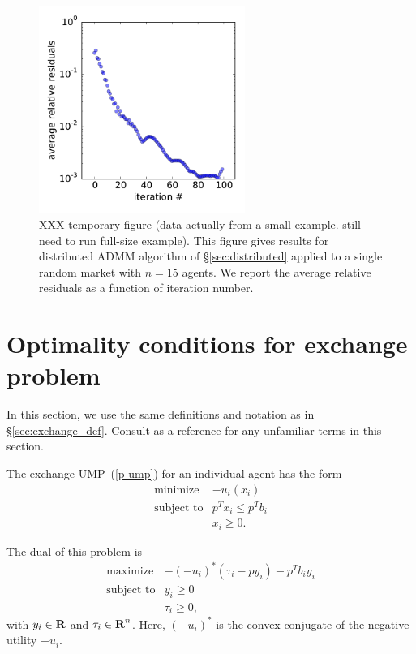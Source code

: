 \documentclass[12pt]{article}
\begin{document}
\begin{figure}
\begin{center}
\includegraphics[width=0.6\textwidth]{figures/admm}
\end{center}
\caption{XXX temporary figure (data actually from a small example. still need
to run full-size example). This figure gives results for distributed ADMM
algorithm of \S\ref{sec:distributed} applied to a single random market
with $n=15$ agents. We report the average relative residuals as a function
of iteration number.}
\label{f-admm}
\end{figure}


\appendix


\section{Optimality conditions for exchange problem}
\label{sec:exchange_proof}

In this section, we use the same definitions and notation as in
\S\ref{sec:exchange_def}.
Consult \cite{BoV:04} as a reference for any
unfamiliar terms in this section.

The exchange UMP~(\ref{p-ump}) for an individual agent has the form
\[
\begin{array}{ll}
\mbox{minimize} & - u_i(x_i)\\
\mbox{subject to} & p^T x_i \leq p^T b_i\\
& x_i \geq 0.
\end{array}
\]

The dual of this problem is
\[
\begin{array}{ll}
\mbox{maximize} & -(- u_i)^*(\tau_i - p y_i) - p^T b_i y_i\\
\mbox{subject to} & y_i \geq 0\\
& \tau_i \geq 0,
\end{array}
\]
with $y_i \in {\mbox{\bf R}}$ and $\tau_i \in {\mbox{\bf R}}^n$. Here, $(- u_i)^*$
is the convex conjugate of the negative utility $-u_i$.
\end{document}
